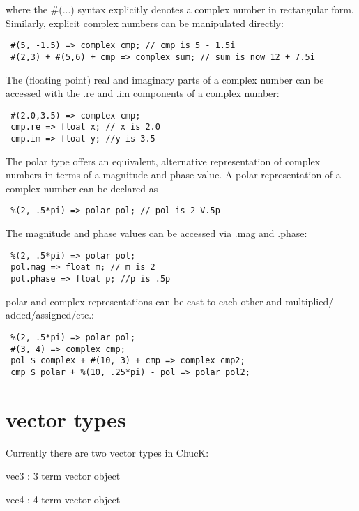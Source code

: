 where the \#(...) syntax explicitly denotes a complex number in rectangular
form. Similarly, explicit complex numbers can be manipulated directly:

\begin{verbatim}
 #(5, -1.5) => complex cmp; // cmp is 5 - 1.5i
 #(2,3) + #(5,6) + cmp => complex sum; // sum is now 12 + 7.5i
\end{verbatim}

The (floating point) real and imaginary parts of a complex number can be
accessed with the .re and .im components of a complex number:

\begin{verbatim}
 #(2.0,3.5) => complex cmp;
 cmp.re => float x; // x is 2.0
 cmp.im => float y; //y is 3.5
\end{verbatim}

The polar type offers an equivalent, alternative representation of complex
numbers in terms of a magnitude and phase value. A polar representation of a
complex number can be declared as

\begin{verbatim}
 %(2, .5*pi) => polar pol; // pol is 2-V.5p
\end{verbatim}

The magnitude and phase values can be accessed via .mag and .phase:

\begin{verbatim}
 %(2, .5*pi) => polar pol;
 pol.mag => float m; // m is 2
 pol.phase => float p; //p is .5p
\end{verbatim}

polar and complex representations can be cast to each other and multiplied/
added/assigned/etc.:

\begin{verbatim}
 %(2, .5*pi) => polar pol;
 #(3, 4) => complex cmp;
 pol $ complex + #(10, 3) + cmp => complex cmp2;
 cmp $ polar + %(10, .25*pi) - pol => polar pol2;
\end{verbatim}

\section{vector types}

Currently there are two vector types in ChucK:

\begin{chuckitemize}
\item  vec3 : 3 term vector object
\item  vec4 : 4 term vector object
\end{chuckitemize}

